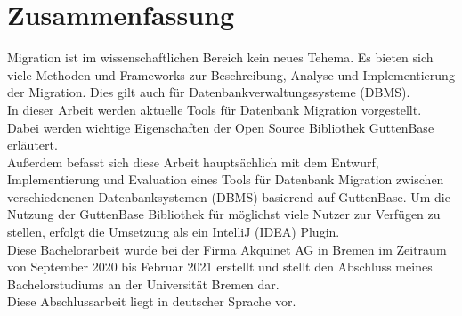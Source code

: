 \section*{Zusammenfassung}

Migration ist im wissenschaftlichen Bereich kein neues Tehema. Es bieten sich viele Methoden und Frameworks zur Beschreibung, Analyse und Implementierung der Migration. Dies gilt auch für Datenbankverwaltungssysteme (DBMS). \\ 
In dieser Arbeit werden aktuelle Tools für Datenbank Migration vorgestellt. Dabei werden wichtige Eigenschaften der Open Source Bibliothek GuttenBase erläutert.\\
Außerdem befasst sich diese Arbeit hauptsächlich mit dem Entwurf, Implementierung und Evaluation eines Tools für Datenbank Migration zwischen verschiedenenen Datenbanksystemen (DBMS) basierend auf GuttenBase.
Um die Nutzung der GuttenBase Bibliothek für möglichst viele Nutzer zur Verfügen zu stellen, erfolgt die Umsetzung als ein IntelliJ (IDEA) Plugin.\\ 
Diese Bachelorarbeit wurde bei der Firma Akquinet AG in Bremen im Zeitraum von September 2020 bis Februar 2021 erstellt und stellt den Abschluss meines Bachelorstudiums an der Universität Bremen dar. \\ 
Diese Abschlussarbeit liegt in deutscher Sprache vor.





